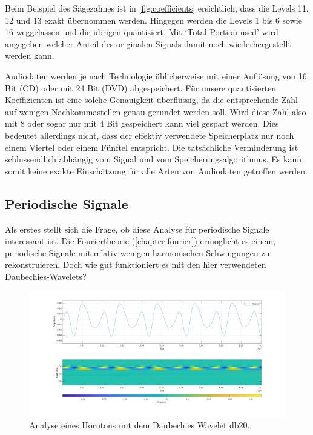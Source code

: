 \begin{refsection}
Beim Beispiel des Sägezahnes ist in \autoref{fig:coefficients} ersichtlich, dass die Levels 11, 12 und 13 exakt übernommen werden.
Hingegen werden die Levels 1 bis 6 sowie 16 weggelassen und die übrigen quantisiert.
Mit `Total Portion used' wird angegeben welcher Anteil des originalen Signals damit noch wiederhergestellt werden kann.

Audiodaten werden je nach Technologie üblicherweise mit einer Auflösung von 16 Bit (CD) oder mit 24 Bit (DVD) abgespeichert. 
Für unsere quantisierten Koeffizienten ist eine solche Genauigkeit überflüssig, da die entsprechende Zahl auf wenigen Nachkommastellen genau gerundet werden soll.
Wird diese Zahl also mit 8 oder sogar nur mit 4 Bit gespeichert kann viel gespart werden.
Dies bedeutet allerdings nicht, dass der effektiv verwendete Speicherplatz nur noch einem Viertel oder einem Fünftel entspricht.
Die tatsächliche Verminderung ist schlussendlich abhängig vom Signal und vom Speicherungsalgorithmus.
Es kann somit keine exakte Einschätzung für alle Arten von Audiodaten getroffen werden. 

\subsection{Periodische Signale}
Als erstes stellt sich die Frage, ob diese Analyse für periodische Signale interessant ist.
Die Fouriertheorie (\autoref{chapter:fourier}) ermöglicht es einem, periodische Signale mit relativ wenigen harmonischen Schwingungen zu rekonstruieren.
Doch wie gut funktioniert es mit den hier verwendeten Daubechies-Wavelets?

\begin{figure}
	\centering
	\includegraphics[width=\linewidth]{papers/compress/Bilder/frenchHorn_normal.pdf}
	\caption{Analyse eines Horntons mit dem Daubechies Wavelet db20.}
	\label{fig:horn}
\end{figure}


\end{refsection}
